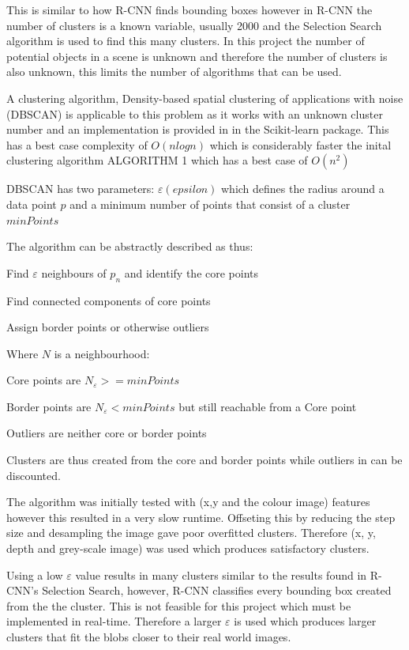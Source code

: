 \documentclass{mproj}
\begin{document}
This is similar to how R-CNN finds bounding boxes however in R-CNN the number of clusters is a known variable, usually 2000 and the Selection Search algorithm is used to find this many clusters. In this project the number of potential objects in a scene is unknown and therefore the number of clusters is also unknown, this limits the number of algorithms that can be used.

A clustering algorithm, Density-based spatial clustering of applications with noise (DBSCAN)\cite{} is applicable to this problem as it works with an unknown cluster number and an implementation is provided in in the Scikit-learn package. This has a best case complexity of $O(n log n)$ which is considerably faster the inital clustering algorithm ALGORITHM 1 which has a best case of $O(n^{2})$


DBSCAN has two parameters: $\varepsilon (epsilon)$ which defines the radius around a data point $p$ and a minimum number of points that consist of a cluster $minPoints$

The algorithm can be abstractly described as thus:

    Find $\varepsilon$ neighbours of $p_{n}$ and identify the core points
    
    Find connected components of core points
    
    Assign border points or otherwise outliers
  
Where $N$ is a neighbourhood:
 
Core points are  $N_{\varepsilon} >= minPoints $

Border points are $N_{\varepsilon} < minPoints $ but still reachable from a Core point

Outliers are neither core or border points


Clusters are thus created from the core and border points while outliers in can be discounted.

The algorithm was initially tested with (x,y and the colour image) features however this resulted in a very slow runtime. Offseting this by reducing the step size and desampling the image gave poor overfitted clusters. Therefore (x, y, depth and grey-scale image) was used which produces satisfactory clusters.

 
Using a low $\varepsilon$  value results in many clusters similar to the results found in R-CNN's Selection Search, however, R-CNN classifies every bounding box created from the the cluster. This is not feasible for this project which must be implemented in real-time. Therefore a larger $\varepsilon$ is used which produces larger clusters that fit the blobs closer to their real world images.
\end{document}
